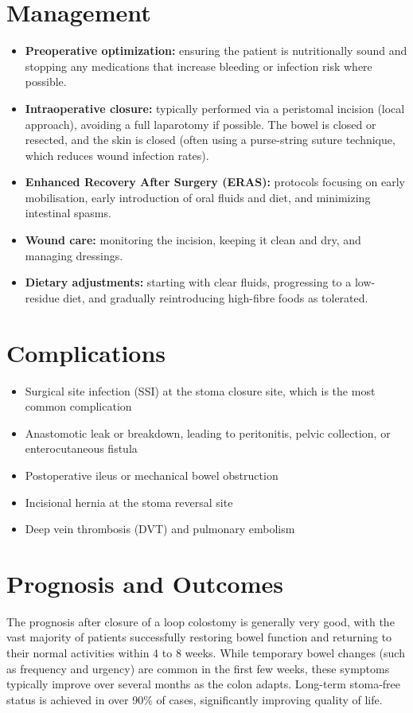 \section*{Management}
\begin{itemize}
    \item \textbf{Preoperative optimization:} ensuring the patient is nutritionally sound and stopping any medications that increase bleeding or infection risk where possible.
    \item \textbf{Intraoperative closure:} typically performed via a peristomal incision (local approach), avoiding a full laparotomy if possible. The bowel is closed or resected, and the skin is closed (often using a purse-string suture technique, which reduces wound infection rates).
    \item \textbf{Enhanced Recovery After Surgery (ERAS):} protocols focusing on early mobilisation, early introduction of oral fluids and diet, and minimizing intestinal spasms.
    \item \textbf{Wound care:} monitoring the incision, keeping it clean and dry, and managing dressings.
    \item \textbf{Dietary adjustments:} starting with clear fluids, progressing to a low-residue diet, and gradually reintroducing high-fibre foods as tolerated.
\end{itemize}

\section*{Complications}
\begin{itemize}
    \item Surgical site infection (SSI) at the stoma closure site, which is the most common complication
    \item Anastomotic leak or breakdown, leading to peritonitis, pelvic collection, or enterocutaneous fistula
    \item Postoperative ileus or mechanical bowel obstruction
    \item Incisional hernia at the stoma reversal site
    \item Deep vein thrombosis (DVT) and pulmonary embolism
\end{itemize}

\section*{Prognosis and Outcomes}
The prognosis after closure of a loop colostomy is generally very good, with the vast majority of patients successfully restoring bowel function and returning to their normal activities within 4 to 8 weeks. While temporary bowel changes (such as frequency and urgency) are common in the first few weeks, these symptoms typically improve over several months as the colon adapts. Long-term stoma-free status is achieved in over 90\% of cases, significantly improving quality of life.

